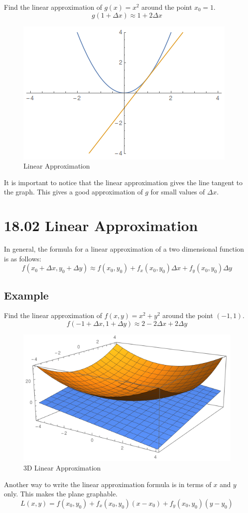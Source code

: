 \documentclass{article}
\begin{document}
Find the linear approximation of $g(x) = x^{2}$ around the point $x_{0} = 1$.
$$ g(1 + \Delta x) \approx 1 + 2 \Delta x $$

\begin{figure}[H]
  \centering
  \includegraphics[scale=0.60]{"LinearApproximation"}
  \caption{Linear Approximation}
\end{figure}

It is important to notice that the linear approximation gives the line tangent
to the graph. This gives a good approximation of $g$ for small values of $\Delta
x$.

\section{18.02 Linear Approximation}

In general, the formula for a linear approximation of a two dimensional function
is as follows:
$$ f(x_{0} + \Delta x, y_{0} + \Delta y) \approx f(x_{0}, y_{0}) + f_{x}(x_{0},
y_{0}) \Delta x + f_{y}(x_{0}, y_{0}) \Delta y $$

\subsection{Example}

Find the linear approximation of $f(x, y) = x^{2} + y^{2}$ around the point
$(-1, 1)$.
$$ f(-1 + \Delta x, 1 + \Delta y) \approx 2 - 2 \Delta x + 2 \Delta y $$

\begin{figure}[H]
  \centering
  \includegraphics[scale=0.60]{"3DLinearApproximation"}
  \caption{3D Linear Approximation}
\end{figure}

Another way to write the linear approximation formula is in terms of $x$ and $y$
only. This makes the plane graphable.
$$ L(x, y) = f(x_{0}, y_{0}) + f_{x}(x_{0}, y_{0})(x - x_{0}) + f_{y}(x_{0},
y_{0})(y - y_{0}) $$
\end{document}
